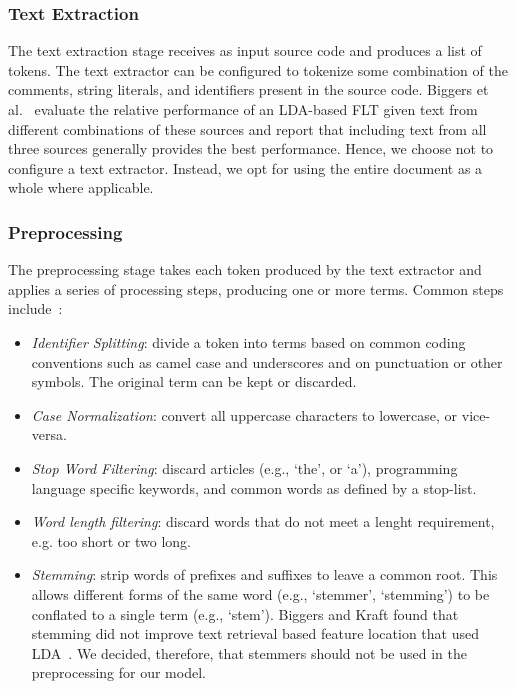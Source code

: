     \subsubsection{Text Extraction}
    The text extraction stage receives as input source code and produces a list of tokens.
    The text extractor can be configured to tokenize some combination of
    the comments, string literals, and identifiers present in the source code.
    Biggers et al.~\cite{Biggers-etal:2014} evaluate the relative performance of an LDA-based FLT
    given text from different combinations of these sources
    and report that including text from all three sources generally provides the best performance.
    Hence, we choose not to configure a text extractor.
    Instead, we opt for using the entire document as a whole where applicable.

    \subsubsection{Preprocessing}
    The preprocessing stage takes each token produced by the text extractor
    and applies a series of processing steps, producing one or more terms.
    Common steps include~\cite{Marcus-etal:2004, Marcus-Menzies:2010}:
    \begin{itemize}
    \setlength{\itemsep}{1pt}
    \item \textit{Identifier Splitting}:
    divide a token into terms based on common coding conventions
    such as camel case and underscores
    and on punctuation or other symbols.
    The original term can be kept or discarded.
    \item \textit{Case Normalization}:
    convert all uppercase characters to lowercase, or vice-versa.
    \item \textit{Stop Word Filtering}:
    discard articles (e.g., ‘the’, or ‘a’),
    programming language specific keywords,
    and common words as defined by a stop-list.
    \item \textit{Word length filtering}:
    discard words that do not meet a lenght requirement,
    e.g. too short or two long.
    \item \textit{Stemming}:
    strip words of prefixes and suffixes to leave a common root.
    This allows different forms of the same word
    (e.g., ‘stemmer’, ‘stemming’)
    to be conflated to a single term
    (e.g., ‘stem’).
    Biggers and Kraft found that stemming did not improve text retrieval based feature location that used LDA~\cite{Biggers-Kraft:2012}.
    We decided,
    therefore,
    that stemmers should not be used in the preprocessing for our model.
    \end{itemize}

